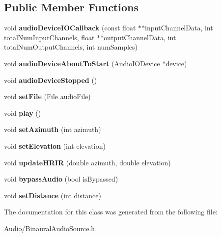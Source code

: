 \subsection*{Public Member Functions}
\begin{DoxyCompactItemize}
\item 
\mbox{\label{class_binaural_audio_source_a272dd293de333d9f2900b1b827246179}} 
void {\bfseries audio\+Device\+I\+O\+Callback} (const float $\ast$$\ast$input\+Channel\+Data, int total\+Num\+Input\+Channels, float $\ast$$\ast$output\+Channel\+Data, int total\+Num\+Output\+Channels, int num\+Samples)
\item 
\mbox{\label{class_binaural_audio_source_a867da6369c0e66c3f7421acfe0bb29b3}} 
void {\bfseries audio\+Device\+About\+To\+Start} (Audio\+I\+O\+Device $\ast$device)
\item 
\mbox{\label{class_binaural_audio_source_ade028ab523ac34018ca10dc8b0997af5}} 
void {\bfseries audio\+Device\+Stopped} ()
\item 
\mbox{\label{class_binaural_audio_source_a946fce5ee9b3cf73df1f8512f7b1485d}} 
void {\bfseries set\+File} (File audio\+File)
\item 
\mbox{\label{class_binaural_audio_source_af30ff2e42983e0156cd52c7cf76bf850}} 
void {\bfseries play} ()
\item 
\mbox{\label{class_binaural_audio_source_adad278c8c6e1a24f2209841d589e3ae3}} 
void {\bfseries set\+Azimuth} (int azimuth)
\item 
\mbox{\label{class_binaural_audio_source_a32e840e842c20af332be539066d41a59}} 
void {\bfseries set\+Elevation} (int elevation)
\item 
\mbox{\label{class_binaural_audio_source_a26cee098b2d2645ce7f4d34df29fb25b}} 
void {\bfseries update\+H\+R\+IR} (double azimuth, double elevation)
\item 
\mbox{\label{class_binaural_audio_source_a1f3a74e7a1905ebdd60c2bcc221bc3b6}} 
void {\bfseries bypass\+Audio} (bool is\+Bypassed)
\item 
\mbox{\label{class_binaural_audio_source_a009b7bc8cfd9ea4c5030035de1550d18}} 
void {\bfseries set\+Distance} (int distance)
\end{DoxyCompactItemize}


The documentation for this class was generated from the following file\+:\begin{DoxyCompactItemize}
\item 
Audio/Binaural\+Audio\+Source.\+h\end{DoxyCompactItemize}
